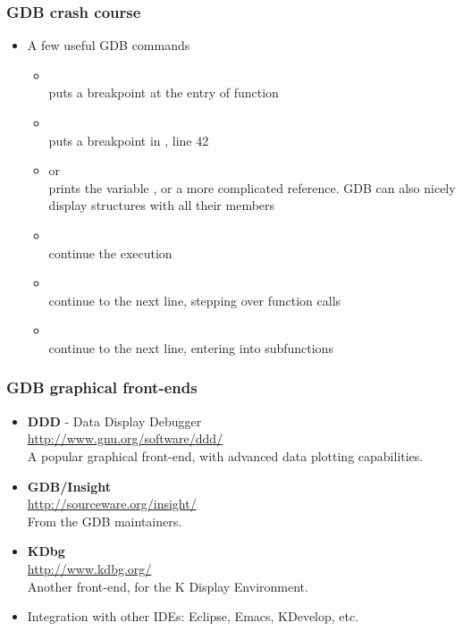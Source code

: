 \begin{frame}
  \frametitle{GDB crash course}
  \begin{itemize}
  \item A few useful GDB commands
    \begin{itemize}
    \item {}\\
      puts a breakpoint at the entry of function 
    \item {}\\
      puts a breakpoint in , line 42
    \item {} or \\
      prints the variable , or a more complicated reference. GDB
      can also nicely display structures with all their members
    \item {}\\
      continue the execution
    \item {}\\
      continue to the next line, stepping over function calls
    \item {}\\
      continue to the next line, entering into subfunctions
    \end{itemize}
  \end{itemize}
\end{frame}

\begin{frame}
  \frametitle{GDB graphical front-ends}
  \begin{itemize}
  \item {\bf DDD} - Data Display Debugger\\
    \url{http://www.gnu.org/software/ddd/}\\
    A popular graphical front-end, with advanced data plotting
    capabilities.
  \item {\bf GDB/Insight}\\
    \url{http://sourceware.org/insight/}\\
    From the GDB maintainers.
  \item {\bf KDbg}\\
    \url{http://www.kdbg.org/}\\
    Another front-end, for the K Display Environment.
  \item Integration with other IDEs: Eclipse, Emacs, KDevelop, etc.\\
  \end{itemize}
\end{frame}

